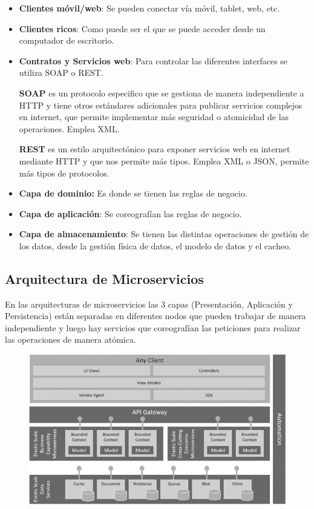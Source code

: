 \documentclass[12pt]{report} %
\begin{document}
\begin{itemize}
	\item \textbf{Clientes móvil/web}: Se pueden conectar vía móvil, tablet, web, etc.
	\item \textbf{Clientes ricos}: Como puede ser el que se puede acceder desde un computador de escritorio.
	\item \textbf{Contratos y Servicios web}: Para controlar las diferentes interfaces se utiliza SOAP o REST.
	
	\textbf{SOAP} es un protocolo especifico que se gestiona de manera independiente a HTTP y tiene otros estándares adicionales para publicar servicios complejos en internet, que permite implementar más seguridad o atomicidad de las operaciones. Emplea XML.

	\textbf{REST} es un estilo arquitectónico para exponer servicios web en internet mediante HTTP y que nos permite más tipos. Emplea XML o JSON, permite más tipos de protocolos.

	\item \textbf{Capa de dominio:} Es donde se tienen las reglas de negocio.
	\item \textbf{Capa de aplicación}: Se coreografían las reglas de negocio.
	\item \textbf{Capa de almacenamiento}: Se tienen las distintas operaciones de gestión de los datos, desde la gestión física de datos, el modelo de datos y el cacheo.
\end{itemize}

\pagebreak
\subsection{Arquitectura de Microservicios}
En las arquitecturas de microservicios las 3 capas (Presentación, Aplicación y Persistencia) están separadas en diferentes nodos que pueden trabajar de manera independiente y luego hay servicios que coreografían las peticiones para realizar las operaciones de manera atómica.

\begin{figure}[H]
	{\includegraphics[scale=.8]{9781484212769_Fig03-03.jpg}}
\end{figure}
\end{document}
